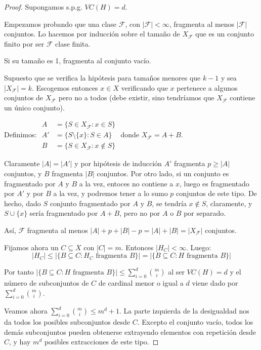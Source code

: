 \begin{proof}
Supongamos s.p.g. $VC(H) = d$.

Empezamos probando que una clase $\mathcal{F}$, con $|\mathcal{F}| < \infty$, fragmenta al menos $|\mathcal{F}|$ conjuntos. 
Lo hacemos por inducción sobre el tamaño de $X_\mathcal{F}$ que es un conjunto finito por ser $\mathcal{F}$ clase finita.

\begin{subenv}
Si su tamaño es 1, fragmenta al conjunto vacío.

Supuesto que se verifica la hipótesis para tamaños menores que $k-1$ y sea $|X_\mathcal{F}| = k$. Escogemos entonces 
$x\in X$ verificando que $x$ pertenece a algunos conjuntos de $X_\mathcal{F}$ pero no a todos (debe existir, sino 
tendríamos que $X_\mathcal{F}$ contiene un único conjunto).

Definimos: $\begin{array}{ll} 
            A &= \{S \in X_\mathcal{F} : x\in S\} \\
            A'&=\{S\setminus\{x\} : S \in A\} \\ 
            B &= \{S \in X_\mathcal{F} : x\not\in S\}
           \end{array}$ donde $X_{\mathcal{F}} = A + B$.

Claramente $|A| = |A'|$ y por hipótesis de inducción $A'$ fragmenta $p \ge |A|$ conjuntos, y $B$ fragmenta $|B|$ conjuntos. 
Por otro lado, si un conjunto es fragmentado por $A$ y $B$ a la vez, entoces no contiene a $x$, luego es fragmentado por
$A'$ y por $B$ a la vez, y podremos tener a lo sumo $p$ conjuntos de este tipo. De hecho, dado $S$ conjunto fragmentado por
$A$ y $B$, se tendría $x\notin S$, claramente, y $S\cup\{x\}$ sería fragmentado por $A + B$, pero no por $A$ o $B$ por
separado.

Así, $\mathcal{F}$ fragmenta al menos $|A| + p + |B| - p = |A| + |B| = |X_\mathcal{F}|$ conjuntos.
\end{subenv}

Fijamos ahora un $C\subseteq X$ con $|C| = m$. Entonces $|H_C| < \infty$. Luego:
\[
  |H_C| \le |\{B\subseteq C : H_C \textrm{ fragmenta } B\}| = |\{B\subseteq C : H \textrm{ fragmenta } B\}|
\]

Por tanto $|\{B\subseteq C : H \textrm{ fragmenta } B\}| \le \sum_{i=0}^d \binom{m}{i}$ al ser $VC(H)=d$ y el número de 
subconjuntos de $C$ de cardinal menor o igual a $d$ viene dado por $\sum_{i=0}^d \binom{m}{i}$.

Veamos ahora $\sum_{i=0}^d \binom{m}{i} \le m^d + 1$. La parte izquierda de la desigualdad nos da todos los posibles 
subconjuntos desde $C$. Excepto el conjunto vacío, todos los demás subconjuntos pueden obtenerse extrayendo elementos con
repetición desde $C$, y hay $m^d$ posibles extracciones de este tipo.
\end{proof}

